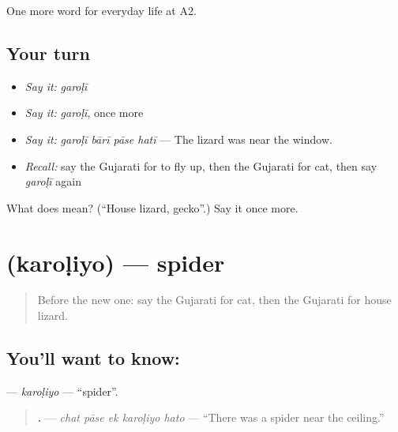 \begin{grammarlens}[title={What you've built}]
One more word for everyday life at A2.
\end{grammarlens}

\subsection*{Your turn}
\begin{itemize}
\raggedright
  \item \emph{Say it:} \emph{garoḷī}
  \item \emph{Say it:} \emph{garoḷī}, once more
  \item \emph{Say it:} \emph{garoḷī bārī pāse hatī} — The lizard was near the window.
  \item \emph{Recall:} say the Gujarati for to fly up, then the Gujarati for cat, then say \emph{garoḷī} again
\end{itemize}

\begin{tcolorbox}[breakable,colback=teal!4,colframe=teal!35!black,title={Before you move on}]
What does  mean? (\textquotedblleft{}House lizard, gecko\textquotedblright{}.) Say it once more.
\end{tcolorbox}
\section[\texorpdfstring{\gu{કરોળિયો} (karoḷiyo)}{કરોળિયો (karoḷiyo)}]{ (karoḷiyo) — spider}

\label{lesson:GU-C238-karoliyo}



\begin{quote}
Before the new one: say the Gujarati for cat, then the Gujarati for house lizard.
\end{quote}

\subsection*{You'll want to know: }
\textbf{} — \emph{karoḷiyo} — \textquotedblleft{}spider\textquotedblright{}.

\begin{quote}
\textbf{    .} — \emph{chat pāse ek karoḷiyo hato} — \textquotedblleft{}There was a spider near the ceiling.\textquotedblright{}
\end{quote}

